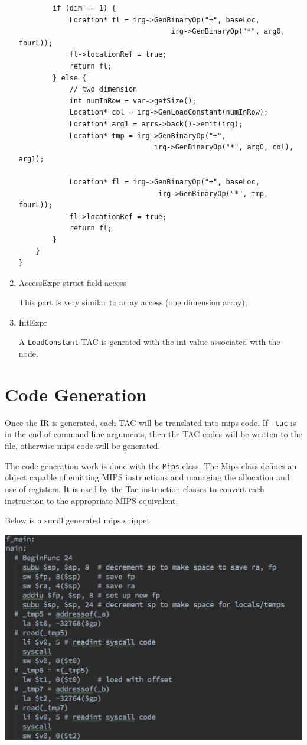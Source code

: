\documentclass[11pt]{article}
\begin{document}
\begin{enumerate}
\begin{verbatim}
        if (dim == 1) {
            Location* fl = irg->GenBinaryOp("+", baseLoc, 
                                    irg->GenBinaryOp("*", arg0, fourL));
            fl->locationRef = true;
            return fl;
        } else {
            // two dimension
            int numInRow = var->getSize();
            Location* col = irg->GenLoadConstant(numInRow);
            Location* arg1 = arrs->back()->emit(irg);
            Location* tmp = irg->GenBinaryOp("+", 
                                irg->GenBinaryOp("*", arg0, col), arg1);

            Location* fl = irg->GenBinaryOp("+", baseLoc, 
                                 irg->GenBinaryOp("*", tmp, fourL));
            fl->locationRef = true;
            return fl;
        }
    }
}
\end{verbatim}

\item AccessExpr struct field access

This part is very similar to array access (one dimension array);

\item IntExpr

A \texttt{LoadConstant} TAC is genrated with the int value associated with the node.
\end{enumerate}



\section{Code Generation}
\label{sec:orgheadline30}
Once the IR is generated, each TAC will be translated into mips code. If
\texttt{-tac} is in the end of command line arguments, then the TAC codes will be
written to the file, otherwise mips code will be generated.

The code generation work is done with the \texttt{Mips} class.
The Mips class defines an object capable of emitting MIPS
instructions and managing the allocation and use of registers.
It is used by the Tac instruction classes to convert each
instruction to the appropriate MIPS equivalent.

Below is a small generated mips snippet

\includegraphics[width=.9\linewidth]{img/mips.png}
\end{document}
